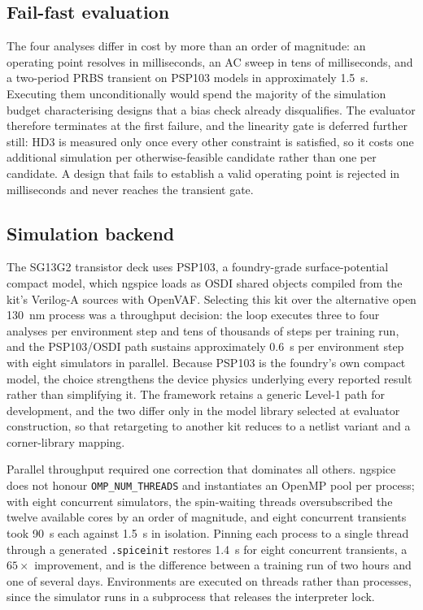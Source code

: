 \documentclass[10pt,a4paper]{article}
\newcommand{\code}[1]{\texttt{\small #1}}
\begin{document}
\subsection{Fail-fast evaluation}

The four analyses differ in cost by more than an order of magnitude: an operating
point resolves in milliseconds, an AC sweep in tens of milliseconds, and a
two-period PRBS transient on PSP103 models in approximately \SI{1.5}{\second}.
Executing them unconditionally would spend the majority of the simulation budget
characterising designs that a bias check already disqualifies. The evaluator
therefore terminates at the first failure, and the linearity gate is deferred
further still: HD3 is measured only once every other constraint is satisfied, so
it costs one additional simulation per otherwise-feasible candidate rather than
one per candidate. A design that fails to establish a valid operating point is
rejected in milliseconds and never reaches the transient gate.

\subsection{Simulation backend}
\label{sec:backend}

The SG13G2 transistor deck uses PSP103, a foundry-grade surface-potential compact
model, which ngspice loads as OSDI shared objects compiled from the kit's
Verilog-A sources with OpenVAF. Selecting this kit over the alternative open
\SI{130}{\nano\meter} process was a throughput decision: the loop executes three
to four analyses per environment step and tens of thousands of steps per training
run, and the PSP103/OSDI path sustains approximately \SI{0.6}{\second} per
environment step with eight simulators in parallel. Because PSP103 is the
foundry's own compact model, the choice strengthens the device physics underlying
every reported result rather than simplifying it. The framework retains a generic
Level-1 path for development, and the two differ only in the model library
selected at evaluator construction, so that retargeting to another kit reduces to
a netlist variant and a corner-library mapping.

Parallel throughput required one correction that dominates all others. ngspice
does not honour \code{OMP\_NUM\_THREADS} and instantiates an OpenMP pool per
process; with eight concurrent simulators, the spin-waiting threads oversubscribed
the twelve available cores by an order of magnitude, and eight concurrent
transients took \SI{90}{\second} each against \SI{1.5}{\second} in isolation.
Pinning each process to a single thread through a generated \code{.spiceinit}
restores \SI{1.4}{\second} for eight concurrent transients, a $65\times$
improvement, and is the difference between a training run of two hours and one of
several days. Environments are executed on threads rather than processes, since
the simulator runs in a subprocess that releases the interpreter lock.
\end{document}

